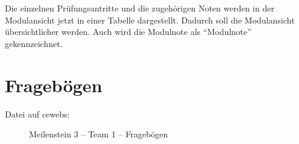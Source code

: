 \documentclass[a4paper,10pt]{scrartcl}
\begin{document}
Die einzelnen Prüfungsantritte und die zugehörigen Noten werden in der Modulansicht jetzt in einer Tabelle dargestellt. Dadurch soll die Modulansicht übersichtlicher werden. Auch wird
die Modulnote als ``Modulnote'' gekennzeichnet.

\noindent{}
\medskip



\section{Fragebögen}

\begin{description}
 \item[Datei auf cewebs:]Meilenstein 3 -- Team 1 -- Fragebögen
\end{description}
\end{document}
